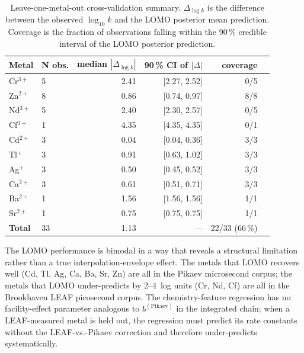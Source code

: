 \documentclass[11pt]{article}
\theoremstyle{plain}
\theoremstyle{definition}
\theoremstyle{remark}
\begin{document}
\begin{table}[h!]
\centering
\caption{Leave-one-metal-out cross-validation summary.  $\Delta_{\log k}$ is
the difference between the observed $\log_{10}\!{k}$ and the LOMO posterior
mean prediction.  Coverage is the fraction of observations falling within
the 90\,\% credible interval of the LOMO posterior prediction.}
\label{tab:lomo}
\small
\begin{tabular}{llrrrr}
\toprule
Metal     & N obs. & median $|\Delta_{\log k}|$ & 90\,\% CI of $|\Delta|$ & coverage \\
\midrule
Cr$^{3+}$ & 5      & 2.41  &  [2.27, 2.52]    & 0/5  \\
Zn$^{2+}$ & 8      & 0.86  &  [0.74, 0.97]    & 8/8  \\
Nd$^{3+}$ & 5      & 2.40  &  [2.30, 2.57]    & 0/5  \\
Cf$^{3+}$ & 1      & 4.35  &  [4.35, 4.35]    & 0/1  \\
Cd$^{2+}$ & 3      & 0.04  &  [0.04, 0.36]    & 3/3  \\
Tl$^{+}$  & 3      & 0.91  &  [0.63, 1.02]    & 3/3  \\
Ag$^{+}$  & 3      & 0.50  &  [0.45, 0.52]    & 3/3  \\
Ca$^{2+}$ & 3      & 0.61  &  [0.51, 0.71]    & 3/3  \\
Ba$^{2+}$ & 1      & 1.56  &  [1.56, 1.56]    & 1/1  \\
Sr$^{2+}$ & 1      & 0.75  &  [0.75, 0.75]    & 1/1  \\
\midrule
\textbf{Total} & 33 & 1.13 & ---             & 22/33 (66\,\%) \\
\bottomrule
\end{tabular}
\end{table}

The LOMO performance is bimodal in a way that reveals a structural
limitation rather than a true interpolation-envelope effect.  The metals
that LOMO recovers well (Cd, Tl, Ag, Ca, Ba, Sr, Zn) are all in the
Pikaev microsecond corpus; the metals that LOMO under-predicts by
2--4~log units (Cr, Nd, Cf) are all in the Brookhaven LEAF picosecond
corpus.  The chemistry-feature regression has no facility-effect
parameter analogous to $b^{(\mathrm{Pikaev})}$ in the integrated chain;
when a LEAF-measured metal is held out, the regression must predict its
rate constants without the LEAF-vs.-Pikaev correction and therefore
under-predicts systematically.
\end{document}
